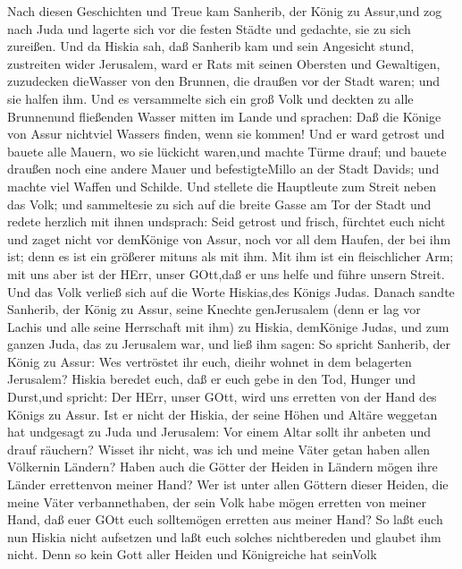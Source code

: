  Nach diesen Geschichten und Treue kam Sanherib, der König
zu Assur,und zog nach Juda und lagerte sich vor die festen Städte und
gedachte, sie zu sich zureißen.  Und da Hiskia sah, daß
Sanherib kam und sein Angesicht stund, zustreiten wider Jerusalem,
 ward er Rats mit seinen Obersten und Gewaltigen, zuzudecken
dieWasser von den Brunnen, die draußen vor der Stadt waren; und sie
halfen ihm.  Und es versammelte sich ein groß Volk und
deckten zu alle Brunnenund fließenden Wasser mitten im Lande und
sprachen: Daß die Könige von Assur nichtviel Wassers finden, wenn sie
kommen!  Und er ward getrost und bauete alle Mauern, wo sie
lückicht waren,und machte Türme drauf; und bauete draußen noch eine
andere Mauer und befestigteMillo an der Stadt Davids; und machte viel
Waffen und Schilde.  Und stellete die Hauptleute zum Streit
neben das Volk; und sammeltesie zu sich auf die breite Gasse am Tor der
Stadt und redete herzlich mit ihnen undsprach:  Seid getrost
und frisch, fürchtet euch nicht und zaget nicht vor demKönige von Assur,
noch vor all dem Haufen, der bei ihm ist; denn es ist ein größerer
mituns als mit ihm.  Mit ihm ist ein fleischlicher Arm; mit
uns aber ist der HErr, unser GOtt,daß er uns helfe und führe unsern
Streit. Und das Volk verließ sich auf die Worte Hiskias,des Königs
Judas.  Danach sandte Sanherib, der König zu Assur, seine
Knechte genJerusalem (denn er lag vor Lachis und alle seine Herrschaft
mit ihm) zu Hiskia, demKönige Judas, und zum ganzen Juda, das zu
Jerusalem war, und ließ ihm sagen:  So spricht Sanherib,
der König zu Assur: Wes vertröstet ihr euch, dieihr wohnet in dem
belagerten Jerusalem?  Hiskia beredet euch, daß er euch
gebe in den Tod, Hunger und Durst,und spricht: Der HErr, unser GOtt,
wird uns erretten von der Hand des Königs zu Assur.  Ist er
nicht der Hiskia, der seine Höhen und Altäre weggetan hat undgesagt zu
Juda und Jerusalem: Vor einem Altar sollt ihr anbeten und drauf
räuchern?  Wisset ihr nicht, was ich und meine Väter getan
haben allen Völkernin Ländern? Haben auch die Götter der Heiden in
Ländern mögen ihre Länder errettenvon meiner Hand?  Wer ist
unter allen Göttern dieser Heiden, die meine Väter verbannethaben, der
sein Volk habe mögen erretten von meiner Hand, daß euer GOtt euch
solltemögen erretten aus meiner Hand?  So laßt euch nun
Hiskia nicht aufsetzen und laßt euch solches nichtbereden und glaubet
ihm nicht. Denn so kein Gott aller Heiden und Königreiche hat seinVolk
